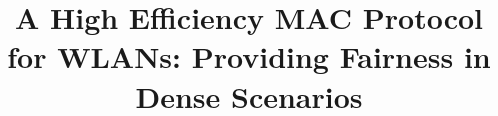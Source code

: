 \documentclass[a4paper,journal]{IEEEtran}
\begin{document}
 \title{A High Efficiency MAC Protocol for WLANs: Providing Fairness in Dense Scenarios}


  \author{
      }%




\maketitle
\end{document}
